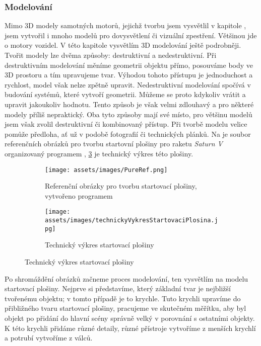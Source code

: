 \subsubsection{Modelování}
{Mimo 3D modely samotných motorů, jejichž tvorbu jsem vysvětlil v kapitole , jsem vytvořil i mnoho modelů pro dovysvětlení či vizuální zpestření. Většinou jde o motory vozidel. V této kapitole vysvětlím 3D modelování ještě podrobněji.}\odst
{Tvořit modely lze dvěma způsoby: destruktivní a nedestruktivní. Při destruktivním modelování měníme geometrii objektu přímo, posouváme body ve 3D prostoru a tím upravujeme tvar. Výhodou tohoto přístupu je jednoduchost a rychlost, model však nelze zpětně upravit. Nedestruktivní modelování spočívá v budování systémů, které vytvoří geometrii. Můžeme se proto kdykoliv vrátit a upravit jakoukoliv hodnotu. Tento způsob je však velmi zdlouhavý a pro některé modely příliš nepraktický. Oba tyto způsoby mají své místo, pro většinu modelů jsem však zvolil destruktivní či kombinovaný přístup.}\odst
{Při tvorbě modelu velice pomůže předloha, ať už v podobě fotografií či technických plánků. Na  je soubor referenčních obrázků pro tvorbu startovní plošiny pro raketu \textit{Saturn V} organizovaný programem , \ref{obr:predlohaVykres} je technický výkres této plošiny.}
\begin{figure}[H]
    \centering
    \begingroup
    \makeatletter
    \renewcommand\thesubfigure{\thefigure~--~\@nameuse{subfiglabel@\alph{subfigure}}}
    \newcommand{\subfiglabel@a}{vlevo}
    \newcommand{\subfiglabel@b}{vpravo}
    \captionsetup[subfigure]{labelformat=simple, labelsep=colon}
    \renewcommand\p@subfigure{}
    \makeatother
    \begin{subfigure}{.7\textwidth}
        \centering
        \texttt{[image: assets/images/PureRef.png]}
        \caption{Referenční obrázky pro tvorbu startovací plošiny, \\vytvořeno programem }
        \label{obr:predlohaFotky}
    \end{subfigure}%
    \begin{subfigure}{.3\textwidth}
        \centering
        \texttt{[image: assets/images/technickyVykresStartovaciPlosina.jpg]}
        \caption{Technický výkres startovací plošiny}
        \label{obr:predlohaVykres}
    \end{subfigure}
    \endgroup
\end{figure}
{Po shromáždění obrázků začneme proces modelování, ten vysvětlím na modelu startovací plošiny. Nejprve si představíme, který základní tvar je nejbližší tvořenému objektu; v tomto případě je to krychle. Tuto krychli upravíme do přibližného tvaru startovací plošiny, pracujeme ve skutečném měřítku, aby byl objekt po přidání do hlavní scény správně velký v porovnání s ostatními objekty. K této krychli přidáme různé detaily, různé přístroje vytvoříme z menších krychlí a potrubí vytvoříme z válců.}

